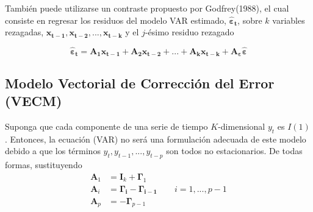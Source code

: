 \documentclass[12pt, twoside]{book}\usepackage[]{graphicx}\usepackage[]{color}
\let\bold\boldsymbol
\let\bf\mathbf
\numberwithin{equation}{section}
\numberwithin{theorem}{section}
\numberwithin{teorema}{section}
\numberwithin{defi}{section}
\numberwithin{prop}{section}
\numberwithin{defi}{section}
\theoremstyle{plain}
\begin{document}
{También puede utilizarse un contraste propuesto por Godfrey(1988),  el cual consiste en regresar los residuos del modelo VAR estimado, $\boldsymbol{\hat{\varepsilon}_{t}}$, sobre $k$ variables rezagadas, $\bold{x_{t-1}, x_{t-2}, ...,x_{t-k}}$ y el $j$-ésimo residuo rezagado

\begin{equation}
\boldsymbol{\hat{\varepsilon}_{t}}=\bold{A_{1}x_{t-1}+A_{2}x_{t-2}+...+A_{k}x_{t-k}+A_{\varepsilon}}\boldsymbol{\hat{\varepsilon}}
\end{equation}

}

\subsection{Modelo Vectorial de Corrección del Error (VECM)}
Suponga que  cada componente de una serie de tiempo $K$-dimensional $y_{t}$ es $I(1)$. Entonces, la ecuación (VAR) no será una formulación adecuada de este modelo debido a que los términos $y_{t},y_{t-1},...,y_{t-p}$ son todos no estacionarios. De todas formas, sustituyendo 
\begin{align}
\bf{A}_{1} & = \bf{I}_{k}+\bold{\Gamma}_{1} \\ 
\bf{A}_{i} & = \bold{\Gamma_{i}}-\bold{\Gamma_{i-1}} \qquad i=1,...,p-1 \\ 
\bf{A}_{p} & = -\bold{\Gamma}_{p-1}
\end{align}
\end{document}
